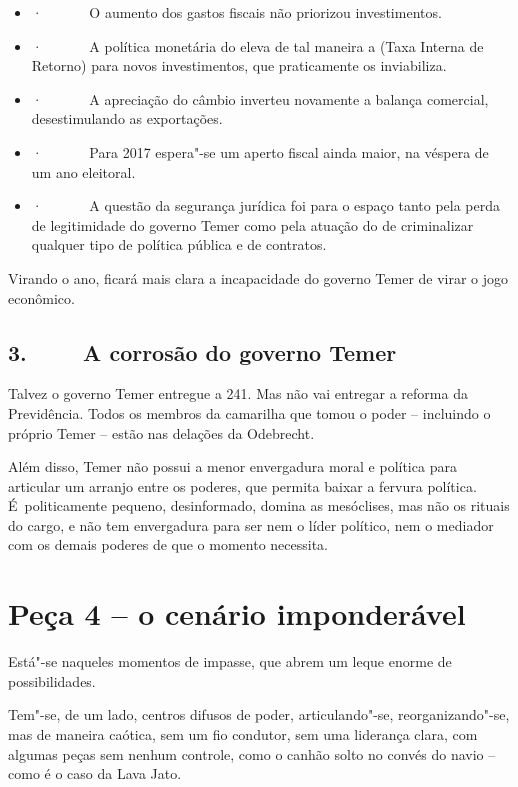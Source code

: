 \begin{itemize}
\itemsep1pt\parskip0pt
\item
  ·~~~~~~ O aumento dos gastos fiscais não priorizou investimentos.
\item
  ·~~~~~~ A política monetária do  eleva de tal maneira a  (Taxa
  Interna de Retorno) para novos investimentos, que praticamente os
  inviabiliza.
\item
  ·~~~~~~ A apreciação do câmbio inverteu novamente a balança comercial,
  desestimulando as exportações.
\item
  ·~~~~~~ Para 2017 espera"-se um aperto fiscal ainda maior, na véspera
  de um ano eleitoral.
\item
  ·~~~~~~ A questão da segurança jurídica foi para o espaço tanto pela
  perda de legitimidade do governo Temer como pela atuação do  de
  criminalizar qualquer tipo de política pública e de contratos.
\end{itemize}

Virando o ano, ficará mais clara a incapacidade do governo Temer de
virar o jogo econômico.

\subsection{3.~~~~ A corrosão do governo Temer}

Talvez o governo Temer entregue a  241. Mas não vai entregar a
reforma da Previdência. Todos os membros da camarilha que tomou o poder
-- incluindo o próprio Temer -- estão nas delações da Odebrecht.

Além disso, Temer não possui a menor envergadura moral e política para
articular um arranjo entre os poderes, que permita baixar a fervura
política. É~politicamente pequeno, desinformado, domina as mesóclises,
mas não os rituais do cargo, e não tem envergadura para ser nem o líder
político, nem o mediador com os demais poderes de que o momento
necessita.

\section{Peça 4 -- o cenário imponderável}

Está"-se naqueles momentos de impasse, que abrem um leque enorme de
possibilidades.

Tem"-se, de um lado, centros difusos de poder, articulando"-se,
reorganizando"-se, mas de maneira caótica, sem um fio condutor, sem uma
liderança clara, com algumas peças sem nenhum controle, como o canhão
solto no convés do navio -- como é o caso da Lava Jato.

